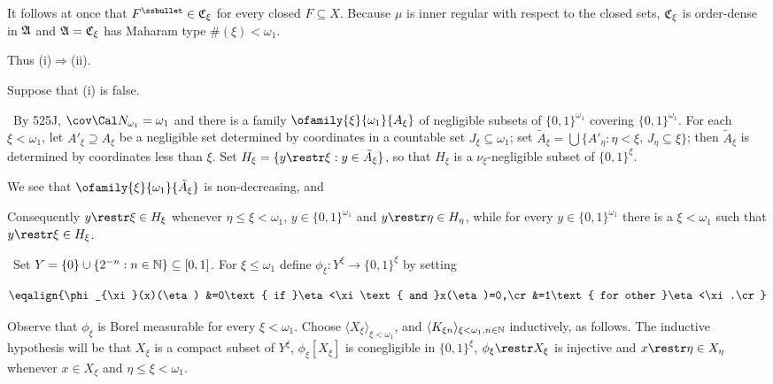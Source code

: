 {It follows at once that $F^{\ssbullet}\in\frak C_{\xi}$ for every closed
$F\subseteq X$.   Because $\mu$ is inner regular with respect to the
closed sets, $\frak C_{\xi}$ is order-dense in $\frak A$ and
$\frak A=\frak C_{\xi}$ has Maharam type $\#(\xi)<\omega_1$.\ \Bang

Thus (i)$\Rightarrow$(ii).

\medskip

 Suppose that (i) is false.

\medskip

\qquad\grheada\ By 525J,
$\cov\Cal N_{\omega_1}=\omega_1$ and there is
a family $\ofamily{\xi}{\omega_1}{A_{\xi}}$ of negligible
subsets of $\{0,1\}^{\omega_1}$ covering $\{0,1\}^{\omega_1}$.
For each $\xi<\omega_1$, let $A'_{\xi}\supseteq A_{\xi}$ be a
negligible set determined by
coordinates in a countable set $J_{\xi}\subseteq\omega_1$;  set
$\tilde A_{\xi}=\bigcup\{A'_{\eta}:\eta<\xi$, $J_{\eta}\subseteq\xi\}$;
then $\tilde A_{\xi}$ is determined by coordinates less than $\xi$.
Set $H_{\xi}=\{y\restr\xi:y\in\tilde A_{\xi}\}$, so that
$H_{\xi}$ is a $\nu_{\xi}$-negligible subset of $\{0,1\}^{\xi}$.

We see that
$\ofamily{\xi}{\omega_1}{\tilde A_{\xi}}$ is non-decreasing, and


\noindent Consequently $y\restr\xi\in H_{\xi}$ whenever
$\eta\le\xi<\omega_1$, $y\in\{0,1\}^{\omega_1}$ and
$y\restr\eta\in H_{\eta}$, while for every
$y\in\{0,1\}^{\omega_1}$ there is a $\xi<\omega_1$ such that
$y\restr\xi\in H_{\xi}$.

\medskip

\qquad\grheadb\ Set $Y=\{0\}\cup\{2^{-n}:n\in\Bbb N\}\subseteq[0,1]$.
For $\xi\le\omega_1$ define $\phi_{\xi}:Y^{\xi}\to\{0,1\}^{\xi}$ by setting

$$\eqalign{\phi_{\xi}(x)(\eta)
&=0\text{ if }\eta<\xi\text{ and }x(\eta)=0,\cr
&=1\text{ for other }\eta<\xi.\cr}$$

\noindent Observe that $\phi_{\xi}$ is Borel measurable for every
$\xi<\omega_1$.   Choose $\langle X_{\xi}\rangle_{\xi<\omega_1}$,
and $\langle K_{\xi n}\rangle_{\xi<\omega_1,n\in\Bbb N}$
inductively, as follows.   The inductive hypothesis will be that $X_{\xi}$
is a compact subset of $Y^{\xi}$, $\phi_{\xi}[X_{\xi}]$ is conegligible
in $\{0,1\}^{\xi}$, $\phi_{\xi}\restr X_{\xi}$ is injective
and $x\restr\eta\in X_{\eta}$ whenever $x\in X_{\xi}$
and $\eta\le\xi<\omega_1$.

}
